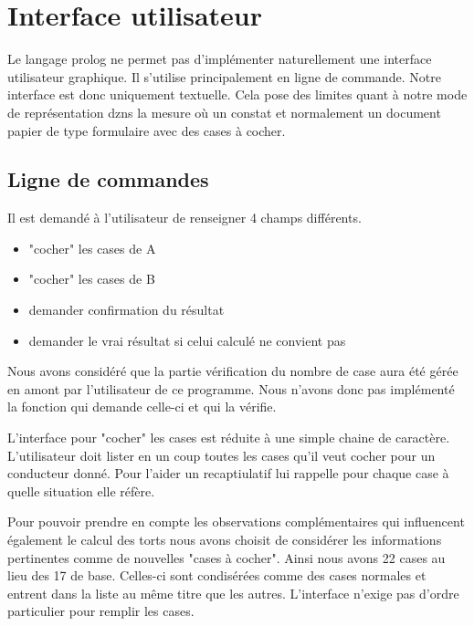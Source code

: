 \chapter{Interface utilisateur}

Le langage prolog ne permet pas d'implémenter naturellement une interface utilisateur graphique. Il s'utilise principalement en ligne de commande. Notre interface est donc uniquement textuelle. Cela pose des limites quant à notre mode de représentation dzns la mesure où un constat et normalement un document papier de type formulaire avec des cases à cocher.

\section{Ligne de commandes}

Il est demandé à l'utilisateur de renseigner 4 champs différents.
\begin{itemize}
\item "cocher" les cases de A
\item "cocher" les cases de B
\item demander confirmation du résultat
\item demander le vrai résultat si celui calculé ne convient pas
\end{itemize}

\vspace*{7mm}
Nous avons considéré que la partie vérification du nombre de case aura été gérée en amont par l'utilisateur de ce programme. Nous n'avons donc pas implémenté la fonction qui demande celle-ci et qui la vérifie.

L'interface pour "cocher" les cases est réduite à une simple chaine de caractère. L'utilisateur doit lister en un coup toutes les cases qu'il veut cocher pour un conducteur donné. Pour l'aider un recaptiulatif lui rappelle pour chaque case à quelle situation elle réfère.
\newline
\vspace*{7mm}

Pour pouvoir prendre en compte les observations complémentaires qui influencent également le calcul des torts nous avons choisit de considérer les informations pertinentes comme de nouvelles "cases à cocher". Ainsi nous avons 22 cases au lieu des 17 de base.
Celles-ci sont condisérées comme des cases normales et entrent dans la liste au même titre que les autres.
L'interface n'exige pas d'ordre particulier pour remplir les cases.
\newline

